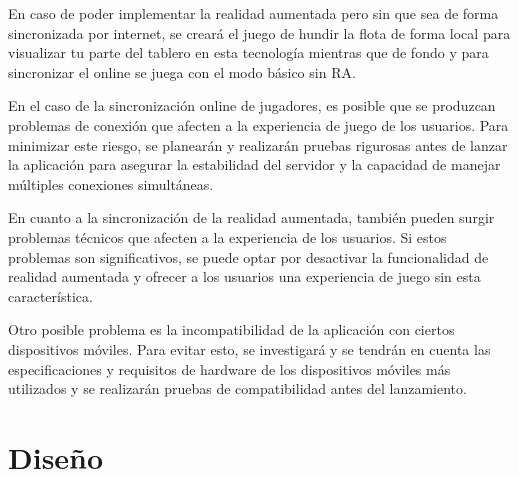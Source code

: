 \documentclass[a4paper, openright, 12pt]{article}
\begin{document}
En caso de poder implementar la realidad aumentada pero sin que sea de forma sincronizada por internet, se creará el juego de hundir la flota de forma local para visualizar tu parte del tablero en esta tecnología mientras que de fondo y para sincronizar el online se juega con el modo básico sin RA.

En el caso de la sincronización online de jugadores, es posible que se produzcan problemas de conexión que afecten a la experiencia de juego de los usuarios. Para minimizar este riesgo, se planearán y realizarán pruebas rigurosas antes de lanzar la aplicación para asegurar la estabilidad del servidor y la capacidad de manejar múltiples conexiones simultáneas.

En cuanto a la sincronización de la realidad aumentada, también pueden surgir problemas técnicos que afecten a la experiencia de los usuarios. Si estos problemas son significativos, se puede optar por desactivar la funcionalidad de realidad aumentada y ofrecer a los usuarios una experiencia de juego sin esta característica.

Otro posible problema es la incompatibilidad de la aplicación con ciertos dispositivos móviles. Para evitar esto, se investigará y se tendrán en cuenta las especificaciones y requisitos de hardware de los dispositivos móviles más utilizados y se realizarán pruebas de compatibilidad antes del lanzamiento.

\section{Diseño}
\end{document}

